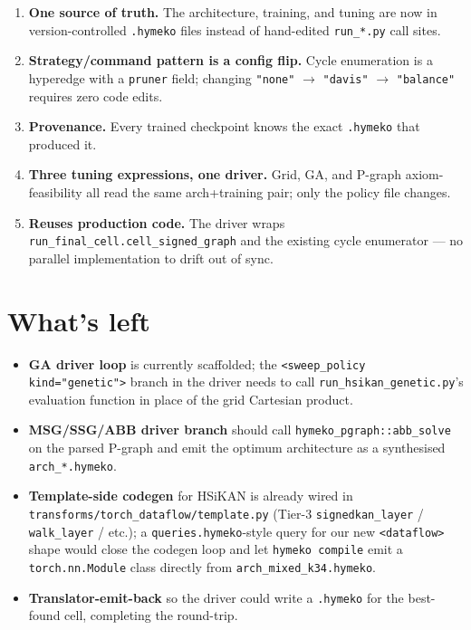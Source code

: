 \documentclass[11pt,a4paper]{article}
\newcommand{\code}[1]{\texttt{\small #1}}
\begin{document}
\begin{enumerate}[label=(\arabic*)]
\item \textbf{One source of truth.} The architecture, training,
      and tuning are now in version-controlled \code{.hymeko}
      files instead of hand-edited \code{run\_*.py} call sites.
\item \textbf{Strategy/command pattern is a config flip.} Cycle
      enumeration is a hyperedge with a \code{pruner} field;
      changing \code{"none"} $\to$ \code{"davis"} $\to$
      \code{"balance"} requires zero code edits.
\item \textbf{Provenance.} Every trained checkpoint knows the
      exact \code{.hymeko} that produced it.
\item \textbf{Three tuning expressions, one driver.} Grid, GA, and
      P-graph axiom-feasibility all read the same arch+training
      pair; only the policy file changes.
\item \textbf{Reuses production code.} The driver wraps
      \code{run\_final\_cell.cell\_signed\_graph} and the existing
      cycle enumerator --- no parallel implementation to drift out
      of sync.
\end{enumerate}

\section{What's left}

\begin{itemize}
\item \textbf{GA driver loop} is currently scaffolded; the
      \code{<sweep\_policy kind="genetic">} branch in the driver
      needs to call \code{run\_hsikan\_genetic.py}'s evaluation
      function in place of the grid Cartesian product.
\item \textbf{MSG/SSG/ABB driver branch} should call
      \code{hymeko\_pgraph::abb\_solve} on the parsed P-graph and
      emit the optimum architecture as a synthesised
      \code{arch\_*.hymeko}.
\item \textbf{Template-side codegen} for HSiKAN is already wired
      in \code{transforms/torch\_dataflow/template.py} (Tier-3
      \code{signedkan\_layer} / \code{walk\_layer} / etc.); a
      \code{queries.hymeko}-style query for our new \code{<dataflow>}
      shape would close the codegen loop and let \code{hymeko
      compile} emit a \code{torch.nn.Module} class directly from
      \code{arch\_mixed\_k34.hymeko}.
\item \textbf{Translator-emit-back} so the driver could write a
      \code{.hymeko} for the best-found cell, completing the
      round-trip.
\end{itemize}
\end{document}
